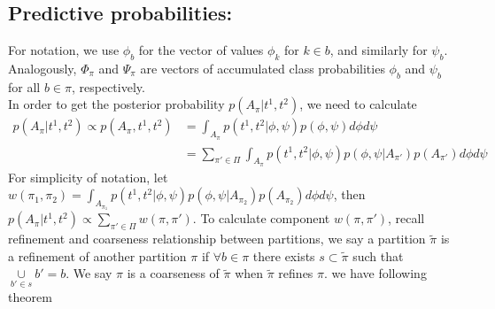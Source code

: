 \documentclass[11pt]{amsart}
\begin{document}
\subsection{Predictive probabilities:}
For notation, we use $\phi_b$ for the vector of values $\phi_k$ for $k \in b$,
and similarly for $\psi_b$. Analogously, $\Phi_\pi$ and $\Psi_\pi$
 are vectors of 
accumulated class probabilities $\phi_b$ and $\psi_b$ for all $b \in \pi$,
 respectively. \\
In order to get the posterior probability $p(A_\pi | t^1,t^2)$, we need to calculate 
\[
\begin{split}
p(A_\pi | t^1,t^2)\propto p(A_\pi, t^1,t^2) &= \int_{A_\pi} p(t^1,t^2|\phi,\psi)p(\phi,\psi) d\phi d\psi\\ 
&= \sum_{\pi'\in \Pi}\int_{A_\pi} p(t^1,t^2|\phi,\psi)p(\phi, \psi | A_{\pi'})p(A_{\pi'})d\phi d\psi
\end{split}
\]
For simplicity of notation, let $w(\pi_1, \pi_2) = \int_{A_{\pi_1}} p(t^1,t^2|\phi,\psi)p(\phi, \psi | A_{\pi_2})p(A_{\pi_2})d\phi d\psi$, then 
$p(A_\pi | t^1,t^2)\propto \underset{\pi'\in \Pi}\sum w(\pi, \pi')$. To calculate component $w(\pi, \pi')$, recall refinement and coarseness relationship between partitions, we say a partition $\tilde{\pi}$ is a refinement of another partition $\pi$ if $\forall b \in \pi$ there exists $s \subset \tilde{\pi}$  such that $\underset{b'\in s}\cup b' = b$. We say $\pi$ is a coarseness of $\tilde{\pi}$ when $\tilde{\pi}$ refines $\pi$. we have following theorem
\end{document}
